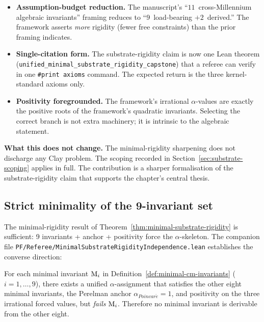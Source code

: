 \begin{itemize}
\item \textbf{Assumption-budget reduction.} The manuscript's
``$11$~cross-Millennium algebraic invariants'' framing reduces to
``$9$~load-bearing $+ 2$~derived.'' The framework asserts \emph{more}
rigidity (fewer free constraints) than the prior framing indicates.

\item \textbf{Single-citation form.} The substrate-rigidity claim is
now one Lean theorem
(\texttt{unified\_\allowbreak{}minimal\_\allowbreak{}substrate\_\allowbreak{}rigidity\_\allowbreak{}capstone}) that a
referee can verify in one \texttt{\#print axioms} command. The
expected return is the three kernel-standard axioms only.

\item \textbf{Positivity foregrounded.} The framework's irrational
$\alpha$-values are exactly the positive roots of the framework's
quadratic invariants. Selecting the correct branch is not extra
machinery; it is intrinsic to the algebraic statement.
\end{itemize}

\noindent\textbf{What this does not change.}
The minimal-rigidity sharpening does not discharge any Clay
problem. The scoping recorded in
Section~\ref{sec:substrate-scoping} applies in full. The
contribution is a sharper formalisation of the substrate-rigidity
claim that supports the chapter's central thesis.

\subsection{Strict minimality of the 9-invariant set}
\label{subsec:strict-minimality}

The minimal-rigidity result of
Theorem~\ref{thm:minimal-substrate-rigidity} is sufficient: 9
invariants + anchor + positivity force the $\alpha$-skeleton. The
companion file
\texttt{PF/\allowbreak{}Referee/\allowbreak{}Minimal\allowbreak{}Substrate\allowbreak{}Rigidity\allowbreak{}Independence.\allowbreak{}lean}
establishes the converse direction:

\begin{theorem}
\label{thm:strict-minimality}
For each minimal invariant $\textnormal{M}_i$ in
Definition~\ref{def:minimal-cm-invariants} ($i = 1, \ldots, 9$),
there exists a unified $\alpha$-assignment that satisfies the other
eight minimal invariants, the Perelman anchor
$\alpha_{Poincar\acute{e}} = 1$, and positivity on the three
irrational forced values, but \emph{fails} $\textnormal{M}_i$.
Therefore no minimal invariant is derivable from the other eight.
\end{theorem}

